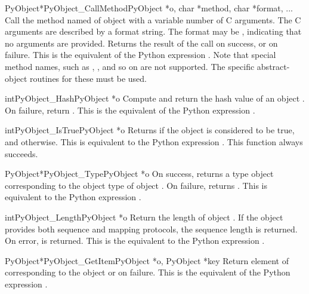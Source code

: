 \documentclass{manual}
\begin{document}
\begin{cfuncdesc}{PyObject*}{PyObject_CallMethod}{PyObject *o,
                                           char *method, char *format, ...}
Call the method named  of object  with a variable number
of C arguments.  The C arguments are described by a
 format string.  The format may be \NULL{},
indicating that no arguments are provided. Returns the result of the
call on success, or \NULL{} on failure.  This is the equivalent of the
Python expression .
Note that special method names, such as ,
, and so on are not supported.  The specific
abstract-object routines for these must be used.
\end{cfuncdesc}


\begin{cfuncdesc}{int}{PyObject_Hash}{PyObject *o}
Compute and return the hash value of an object .  On
failure, return .  This is the equivalent of the Python
expression .
\end{cfuncdesc}


\begin{cfuncdesc}{int}{PyObject_IsTrue}{PyObject *o}
Returns  if the object  is considered to be true, and
 otherwise. This is equivalent to the Python expression
.
This function always succeeds.
\end{cfuncdesc}


\begin{cfuncdesc}{PyObject*}{PyObject_Type}{PyObject *o}
On success, returns a type object corresponding to the object
type of object . On failure, returns \NULL{}.  This is
equivalent to the Python expression .
\end{cfuncdesc}

\begin{cfuncdesc}{int}{PyObject_Length}{PyObject *o}
Return the length of object .  If the object  provides
both sequence and mapping protocols, the sequence length is
returned.  On error,  is returned.  This is the equivalent
to the Python expression .
\end{cfuncdesc}


\begin{cfuncdesc}{PyObject*}{PyObject_GetItem}{PyObject *o, PyObject *key}
Return element of  corresponding to the object  or
\NULL{} on failure. This is the equivalent of the Python expression
.
\end{cfuncdesc}
\end{document}
